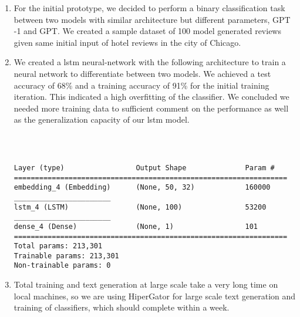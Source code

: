 \documentclass[11pt,letterpaper]{article}
\begin{document}
        \begin{enumerate}
                \item For the initial prototype, we decided to perform a binary classification task between two models with similar architecture but different parameters, GPT -1 and GPT. We created a sample dataset of 100 model generated reviews given same initial input of hotel reviews in the city of Chicago. 
                \item We created a lstm neural-network with the following architecture to train a neural network to differentiate between two models. We achieved a test accuracy of 68\% and a training accuracy of 91\% for the initial training iteration. This indicated a high overfitting of the classifier. We concluded we needed more training data to sufficient comment on the performance as well as the generalization capacity of our lstm model. 
                \begin{verbatim}



Layer (type)                 Output Shape              Param #   
=================================================================
embedding_4 (Embedding)      (None, 50, 32)            160000    
_______________________
lstm_4 (LSTM)                (None, 100)               53200     
_______________________
dense_4 (Dense)              (None, 1)                 101       
=================================================================
Total params: 213,301
Trainable params: 213,301
Non-trainable params: 0
                \end{verbatim}
                \item Total training and text generation at large scale take a very long time on local machines, so we are using HiperGator for large scale text generation and training of classifiers, which should complete within a week.
        \end{enumerate}
\end{document}

